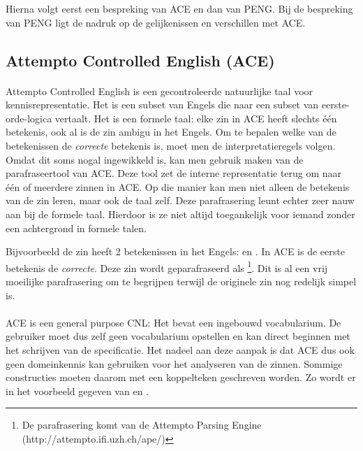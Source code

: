 Hierna volgt eerst een bespreking van ACE en dan van PENG. Bij de bespreking van PENG ligt de nadruk op de gelijkenissen en verschillen met ACE. %

\subsection{Attempto Controlled English (ACE)}
\paragraph{} Attempto Controlled English \cite{Fuchs2008} is een gecontroleerde natuurlijke taal voor kennisrepresentatie. Het is een subset van Engels die naar een subset van eerste-orde-logica vertaalt. Het is een formele taal: elke zin in ACE heeft slechts \'e\'en betekenis, ook al is de zin ambigu in het Engels. Om te bepalen welke van de betekenissen de \textit{correcte} betekenis is, moet men de interpretatieregels volgen. Omdat dit soms nogal ingewikkeld is, kan men gebruik maken van de parafraseertool van ACE. Deze tool zet de interne representatie terug om naar \'e\'en of meerdere zinnen in ACE. Op die manier kan men niet alleen de betekenis van de zin leren, maar ook de taal zelf. Deze parafrasering leunt echter zeer nauw aan bij de formele taal. Hierdoor is ze niet altijd toegankelijk voor iemand zonder een achtergrond in formele talen.

Bijvoorbeeld de zin  heeft 2 betekenissen in het Engels:  en . In ACE is de eerste betekenis de \textit{correcte}. Deze zin wordt geparafraseerd als \footnote{De parafrasering komt van de Attempto Parsing Engine (http://attempto.ifi.uzh.ch/ape/)}. Dit is al een vrij moeilijke parafrasering om te begrijpen terwijl de originele zin nog redelijk simpel is.

\paragraph{}ACE is een general purpose CNL: Het bevat een ingebouwd vocabularium. De gebruiker moet dus zelf geen vocabularium opstellen en kan direct beginnen met het schrijven van de specificatie. Het nadeel aan deze aanpak is dat ACE dus ook geen domeinkennis kan gebruiken voor het analyseren van de zinnen. Sommige constructies moeten daarom met een koppelteken geschreven worden. Zo wordt er in \cite{ACEConstructionRules} het voorbeeld gegeven van  en .

